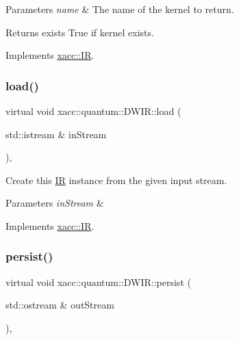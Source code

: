 \begin{DoxyParams}{Parameters}
{\em name} & The name of the kernel to return. \\
\hline
\end{DoxyParams}
\begin{DoxyReturn}{Returns}
exists True if kernel exists. 
\end{DoxyReturn}


Implements \hyperlink{a01175_afc9ccf5126f3fed19c2e879133b2f6d8}{xacc\+::\+IR}.

\mbox{\label{a00979_a8b388d719d565bb902c979807d3d0d47}} 
\subsubsection{\texorpdfstring{load()}{load()}}
{\footnotesize\ttfamily virtual void xacc\+::quantum\+::\+D\+W\+I\+R\+::load (\begin{DoxyParamCaption}\item[{std\+::istream \&}]{in\+Stream }\end{DoxyParamCaption})\hspace{0.3cm}{\ttfamily [inline]}, {\ttfamily [virtual]}}

Create this \hyperlink{a01175}{IR} instance from the given input stream.


\begin{DoxyParams}{Parameters}
{\em in\+Stream} & \\
\hline
\end{DoxyParams}


Implements \hyperlink{a01175_a444c2e4dc0faac500fb70fa93997e9bc}{xacc\+::\+IR}.

\mbox{\label{a00979_abcbfd0a4cf697843391c65cbd9a82080}} 
\subsubsection{\texorpdfstring{persist()}{persist()}}
{\footnotesize\ttfamily virtual void xacc\+::quantum\+::\+D\+W\+I\+R\+::persist (\begin{DoxyParamCaption}\item[{std\+::ostream \&}]{out\+Stream }\end{DoxyParamCaption})\hspace{0.3cm}{\ttfamily [inline]}, {\ttfamily [virtual]}}


